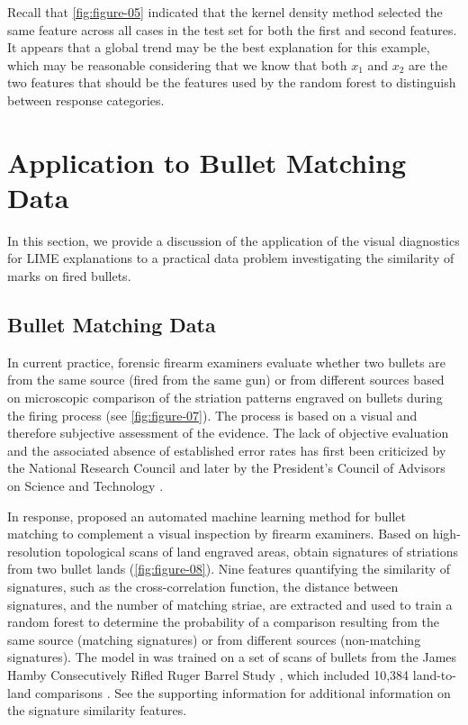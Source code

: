 \documentclass[AMS,STIX2COL]{WileyNJD-v2}\usepackage[]{graphicx}\usepackage[]{color}
\begin{document}
Recall that \autoref{fig:figure-05} indicated that the kernel density method selected the same feature across all cases in the test set for both the first and second features. It appears that a global trend may be the best explanation for this example, which may be reasonable considering that we know that both $x_1$ and $x_2$ are the two features that should be the features used by the random forest to distinguish between response categories.

\section{Application to Bullet Matching Data} \label{application}

In this section, we provide a discussion of the application of the visual diagnostics for LIME explanations to a practical data problem investigating the similarity of marks on fired bullets.

\subsection{Bullet Matching Data}







In current practice, forensic firearm examiners evaluate whether two bullets are from the same source (fired from the same gun) or from different sources based on microscopic comparison of the striation patterns engraved on bullets during the firing process (see \autoref{fig:figure-07}). The process is based on a visual and therefore subjective assessment of the evidence. The lack of objective evaluation and the associated absence of established error rates has first been criticized by the National Research Council \cite{nrc:2009} and later by the President's Council of Advisors on Science and Technology \cite{pcast:2016}.

In response, \citet{hare:2017} proposed an automated machine learning method for bullet matching to complement a visual inspection by firearm examiners. Based on high-resolution topological scans of land engraved areas, \citet{hare:2017} obtain signatures of striations from two bullet lands (\autoref{fig:figure-08}). Nine features quantifying the similarity of signatures, such as the cross-correlation function, the distance between signatures, and the number of matching striae, are extracted and used to train a random forest to determine the probability of a comparison resulting from the same source (matching signatures) or from different sources (non-matching signatures). The model in \citet{hare:2017} was trained on a set of scans of bullets from the James Hamby Consecutively Rifled Ruger Barrel Study \citep{hamby:2009}, which included 10,384 land-to-land comparisons \citet{hare:2017}. See the supporting information for additional information on the signature similarity features.
\end{document}
